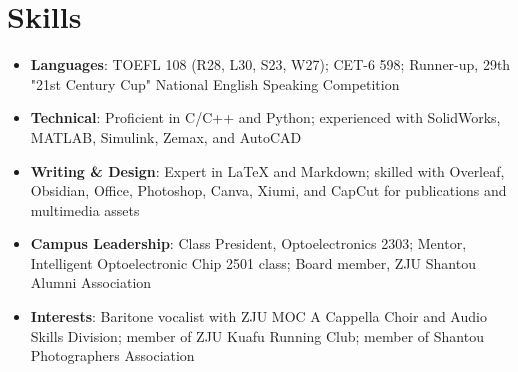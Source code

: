 \documentclass{resume}
\begin{document}
\section{Skills}
\begin{itemize}[parsep=0.5ex]
  \item \textbf{Languages}: TOEFL 108 (R28, L30, S23, W27); CET-6 598; Runner-up, 29th "21st Century Cup" National English Speaking Competition
  \item \textbf{Technical}: Proficient in C/C++ and Python; experienced with SolidWorks, MATLAB, Simulink, Zemax, and AutoCAD
  \item \textbf{Writing \& Design}: Expert in LaTeX and Markdown; skilled with Overleaf, Obsidian, Office, Photoshop, Canva, Xiumi, and CapCut for publications and multimedia assets
  \item \textbf{Campus Leadership}: Class President, Optoelectronics 2303; Mentor, Intelligent Optoelectronic Chip 2501 class; Board member, ZJU Shantou Alumni Association
  \item \textbf{Interests}: Baritone vocalist with ZJU MOC A Cappella Choir and Audio Skills Division; member of ZJU Kuafu Running Club; member of Shantou Photographers Association
\end{itemize}
\end{document}
